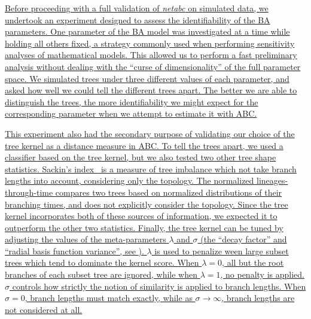 \documentclass[12pt]{article}\usepackage[]{graphicx}\usepackage[]{color}
\newcommand{\add}[1]{\color{blue} \uline{#1} \color{black}}
\begin{document}
\add{Before proceeding with a full validation of \textit{netabc} on simulated
data, we undertook an experiment designed to assess the identifiability of the
BA parameters. One parameter of the BA model was investigated at a time while
holding all others fixed, a strategy commonly used when performing sensitivity
analyses of mathematical models. This allowed us to perform a fast preliminary
analysis without dealing with the ``curse of dimensionality'' of the full
parameter space. We simulated trees under three different values of each
parameter, and asked how well we could tell the different trees apart. The
better we are able to distinguish the trees, the more identifiability we might
expect for the corresponding parameter when we attempt to estimate it with
ABC.}

\add{This experiment also had the secondary purpose of validating our choice of
the tree kernel as a distance measure in ABC. To tell the trees apart, we used
a classifier based on the tree kernel, but we also tested two other tree shape
statistics. Sackin's index~\autocite{shao1990tree} is a measure of tree
imbalance which not take branch lengths into account, considering only the
topology. The normalized lineages-through-time
\autocite[nLTT,][]{janzen2015approximate} compares two trees based on normalized
distributions of their branching times, and does not explicitly consider the
topology. Since the tree kernel incorporates both of these sources of
information, we expected it to outperform the other two statistics. Finally,
the tree kernel can be tuned by adjusting the values of the meta-parameters
$\lambda$ and $\sigma$ (the ``decay factor'' and ``radial basis function
variance'', see \textcite{poon2013mapping}). $\lambda$ is used to penalize
ween large subset trees which tend to dominate the kernel score. When $\lambda
= 0$, all but the root branches of each subset tree are ignored, while when
$\lambda = 1$, no penalty is applied. $\sigma$ controls how strictly the notion
of similarity is applied to branch lengths. When $\sigma = 0$, branch lengths
must match exactly, while as $\sigma \to \infty$, branch lengths are not
considered at all.}
  
\end{document}
